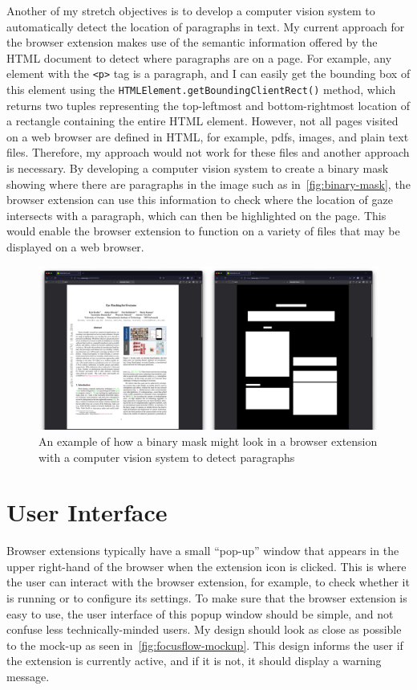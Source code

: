 \documentclass{report}
\begin{document}
Another of my stretch objectives is to develop a computer vision system to automatically detect the location of paragraphs in text. My current approach for the browser extension makes use of the semantic information offered by the HTML document to detect where paragraphs are on a page. For example, any element with the \texttt{<p>} tag is a paragraph, and I can easily get the bounding box of this element using the \texttt{HTMLElement.getBoundingClientRect()} method, which returns two tuples representing the top-leftmost and bottom-rightmost location of a rectangle containing the entire HTML element. However, not all pages visited on a web browser are defined in HTML, for example, pdfs, images, and plain text files. Therefore, my approach would not work for these files and another approach is necessary. By developing a computer vision system to create a binary mask showing where there are paragraphs in the image such as in~\autoref{fig:binary-mask}, the browser extension can use this information to check where the location of gaze intersects with a paragraph, which can then be highlighted on the page. This would enable the browser extension to function on a variety of files that may be displayed on a web browser. 

\begin{figure}
    \centering
    \includegraphics[scale=0.1]{../assets/binary-mask.png}
    \caption{An example of how a binary mask might look in a browser extension with a computer vision system to detect paragraphs}
\end{figure}

\section{User Interface} 

Browser extensions typically have a small ``pop-up'' window that appears in the upper right-hand of the browser when the extension icon is clicked. This is where the user can interact with the browser extension, for example, to check whether it is running or to configure its settings. To make sure that the browser extension is easy to use, the user interface of this popup window should be simple, and not confuse less technically-minded users. My design should look as close as possible to the mock-up as seen in~\autoref{fig:focusflow-mockup}. This design informs the user if the extension is currently active, and if it is not, it should display a warning message. 
\end{document}
